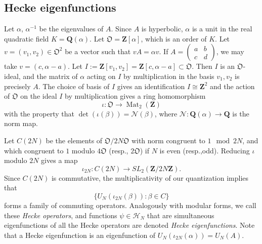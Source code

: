 \documentclass[12pt]{amsart}
\theoremstyle{plain}
\newcommand{\Z}{{\mathbf Z}}
\newcommand{\Q}{{\mathbf Q}}
\newcommand{\unit}{\alpha}
\newcommand{\OK}{\mathfrak{O}_K}
\newcommand{\mnorm}{ {\mathcal N}} %
\newcommand{\UN}{U_N}
\newcommand{\mat}{\operatorname{Mat}}
\newcommand{\OF}{\mathfrak{O}}
\newcommand{\Torusev}{C} %
\newcommand{\Torus}{C}    %
\newcommand{\HN}{\mathcal H_N}
\renewcommand{\^}{\widehat}
\begin{document}
\subsection{Hecke eigenfunctions}\label{sec:Hecke eigenfunctions} 
Let $\unit$, $\unit^{-1}$ 
be the eigenvalues of $A$. 
Since $A$ is  
hyperbolic, $\unit$ is a unit in the real quadratic field $K=\Q(\unit)$.
Let $\OF=\Z[\unit]$, which is an order of $K$.
Let $v=(v_1,v_2)\in\OF^2$ be a vector such that 
$vA = \unit v$. 
If $A=\begin{pmatrix}a&b\\c&d\end{pmatrix}$, 
we may take $v=(c,\unit-a)$.
Let  $I:=\Z[v_1,v_2]=\Z[c,\unit-a]  \subset \OF$. 
Then $I$  is an $\OF$-ideal, and
the matrix of $\unit$ acting on $I$ by 
multiplication in the basis $v_1,v_2$ is precisely $A$. 
The choice of basis of $I$ gives an identification 
$I \cong \Z^2$ and the action of $\OF$  on the ideal $I$  by
multiplication gives  
a ring homomorphism
$$
\iota : \OF \to \mat_2(\Z)
$$ 
with  the property that $\det(\iota(\beta)) =\mnorm(\beta)$, where  
$\mnorm : \Q(\unit) \to \Q$ is the norm map. 

Let $\Torusev(2N)$ be the elements of $\OF/2N\OF$ with norm congruent
to $1\mod 2N$, and which congruent to $1$ modulo $4 \OF$ (resp., $2\OF$) if
$N$ is even (resp.,odd).  
Reducing $\iota$ modulo $2N$ gives a  map
$$
\iota_{2N} : \Torusev(2N) \to SL_2(\Z/2N\Z).
$$
Since $\Torusev(2N)$ is commutative, the multiplicativity of
our quantization 
implies that 
$$
\{ \UN( \iota_{2N}(\beta) ) : \beta \in \Torusev \}
$$
forms  a family of commuting operators.
%
Analogously with modular forms, we call these
{\em Hecke operators},
and functions $\psi \in \HN$ that are simultaneous eigenfunctions of
all the Hecke operators are denoted {\em Hecke eigenfunctions}. Note
that a Hecke eigenfunction is an eigenfunction of
$\UN(\iota_{2N}(\unit))=\UN(A)$.
\end{document}
